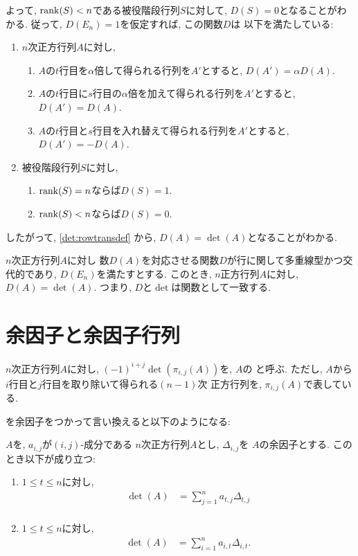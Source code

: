 よって, $\operatorname{rank}(S)<n$である被役階段行列$S$に対して, $D(S)=0$となることがわかる.
従って, $D(E_n)=1$を仮定すれば, この関数$D$は
以下を満たしている:
\begin{enumerate}
  \item $n$次正方行列$A$に対し,
  \begin{enumerate}
  \item 
    $A$の$t$行目を$\alpha$倍して得られる行列を$A'$とすると,
    $D(A')=\alpha D(A)$.
  \item 
    $A$の$t$行目に$s$行目の$\alpha$倍を加えて得られる行列を$A'$とすると,
    $D(A')=D(A)$.
  \item 
    $A$の$t$行目と$s$行目を入れ替えて得られる行列を$A'$とすると,
    $D(A')=-D(A)$.
  \end{enumerate}
  \item 被役階段行列$S$に対し,
  \begin{enumerate}
  \item $\operatorname{rank}(S)=n$ならば$D(S)=1$.
  \item $\operatorname{rank}(S)<n$ならば$D(S)=0$.
  \end{enumerate}
\end{enumerate}
したがって,
\cref{det:rowtransdef}
から, $D(A)=\det(A)$となることがわかる.
\begin{theorem}
  $n$次正方行列$A$に対し
  数$D(A)$を対応させる関数$D$が行に関して多重線型かつ交代的であり,
  $D(E_n)$を満たすとする.
  このとき,
  $n$正方行列$A$に対し, $D(A)=\det(A)$.
  つまり, $D$と$\det$は関数として一致する.
\end{theorem}

\section{余因子と余因子行列}

\begin{definition}
  $n$次正方行列$A$に対し,
  $(-1)^{i+j}\det(\pi_{i,j}(A))$を,
  $A$の
  と呼ぶ.
  ただし,
  $A$から$i$行目と$j$行目を取り除いて得られる$(n-1)$次
  正方行列を, $\pi_{i,j}(A)$で表している.
\end{definition}
を余因子をつかって言い換えると以下のようになる:
\begin{theorem}
  $A$を,
  $a_{i,j}$が$(i,j)$-成分である
  $n$次正方行列$A$とし,
  $\Delta_{i,j}$を
  $A$の余因子とする.
   このとき以下が成り立つ:
  \begin{enumerate}
  \item
  $1\leq t\leq n$に対し,
    \begin{align*}
      \det(A)&=
      \sum_{j=1}^{n} a_{t,j}\Delta_{t,j}\\
    \end{align*}
  \item
  $1\leq t\leq n$に対し,
    \begin{align*}
      \det(A)&=
      \sum_{i=1}^{n} a_{i,t}\Delta_{i,t}.
    \end{align*}
  \end{enumerate}
\end{theorem}

